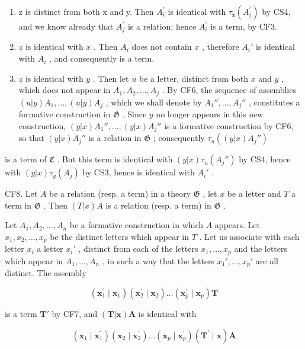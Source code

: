 \begin{enumerate}
\def\labelenumi{(\alph{enumi})}
\item
  z is distinct from both x and y. Then \(A_{i}^{\prime}\) is identical with \(\tau_{\mathbf{z}}(A_{j}^{\prime})\) by CS4, and we know already that \(A_{j}^{\prime}\) is a relation; hence \(A_{i}^{\prime}\) is a term, by CF3.
\item
  \(z\) is identical with \(x\) . Then \(A_i\) does not contain \(x\) , therefore \(A_i'\) is identical with \(A_i\) , and consequently is a term.
\item
  \(z\) is identical with \(y\) . Then let \(u\) be a letter, distinct from both \(x\) and \(y\) , which does not appear in \(A_1, A_2, \ldots, A_j\) . By CF6, the sequence of assemblies \((u|y) A_1, \ldots, (u|y) A_j\) , which we shall denote by \(A_1'', \ldots, A_j''\) , constitutes a formative construction in \(\mathfrak{G}\) . Since \(y\) no longer appears in this new construction, \((y|x) A_1'', \ldots, (y|x) A_j''\) is a formative construction by CF6, so that \((y|x) A_j''\) is a relation in \(\mathfrak{G}\) ; consequently \(\tau_u((y|x)A_j'')\)
\end{enumerate}

is a term of \(\mathfrak{C}\) . But this term is identical with \((y|x)\tau_u(A_j'')\) by CS4, hence with \((y|x)\tau_y(A_j)\) by CS3, hence is identical with \(A_i'\) .

CF8. Let \(A\) be a relation (resp. a term) in a theory \(\mathfrak{G}\) , let \(x\) be a letter and \(T\) a term in \(\mathfrak{G}\) . Then \((T|x)A\) is a relation (resp. a term) in \(\mathfrak{G}\) .

Let \(A_1, A_2, \ldots, A_n\) be a formative construction in which \(A\) appears. Let \(x_1, x_2, \ldots, x_p\) be the distinct letters which appear in \(T\) . Let us associate with each letter \(x_i\) a letter \(x_i'\) , distinct from each of the letters \(x_1, \ldots, x_p\) and the letters which appear in \(A_1, \ldots, A_n\) , in such a way that the letters \(x_1', \ldots, x_p'\) are all distinct. The assembly

\[
\left(\boldsymbol {x} _ {1} ^ {\prime} \mid \boldsymbol {x} _ {1}\right) \left(\boldsymbol {x} _ {2} ^ {\prime} \mid \boldsymbol {x} _ {2}\right) \dots \left(\boldsymbol {x} _ {p} ^ {\prime} \mid \boldsymbol {x} _ {p}\right) \boldsymbol {T}
\]

is a term \(\pmb{T}'\) by CF7, and \((\pmb{T}|\pmb{x})\pmb{A}\) is identical with

\[
\left(\boldsymbol {x} _ {1} \mid \boldsymbol {x} _ {1} ^ {\prime}\right) \left(\boldsymbol {x} _ {2} \mid \boldsymbol {x} _ {2} ^ {\prime}\right) \dots \left(\boldsymbol {x} _ {p} \mid \boldsymbol {x} _ {p} ^ {\prime}\right) \left(\boldsymbol {T} ^ {\prime} \mid \boldsymbol {x}\right) \boldsymbol {A}
\]

